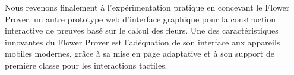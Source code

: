 Nous revenons finalement à l'expérimentation pratique en concevant le Flower
Prover, un autre prototype web d'interface graphique pour la construction
interactive de preuves basé sur le calcul des fleurs. Une des caractéristiques
innovantes du Flower Prover est l'adéquation de son interface aux appareils
mobiles modernes, grâce à sa mise en page adaptative et à son support de
première classe pour les interactions tactiles.